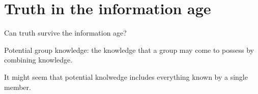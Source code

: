 \section{Truth in the information age}
Can truth survive the information age?

Potential group knowledge: the knowledge that a group may come to possess by
combining knowledge.

It might seem that potential knolwedge includes everything known by a single
member.